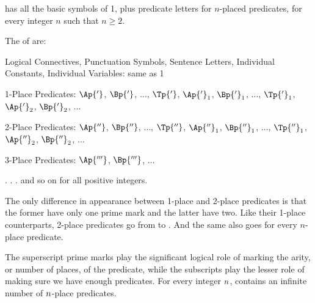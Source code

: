 \GQL{} has all the basic symbols of \GQL{}1, plus predicate letters for $n$-placed predicates, for every integer $n$ such that $n\geq2$. 
\begin{majorILnc}{}
The  of \GQL{} are:
\begin{cenumerate}
\item Logical Connectives, Punctuation Symbols, Sentence Letters, Individual Constants, Individual Variables: same as \GQL{}1
\item 1-Place Predicates: $\Ap{'}$, $\Bp{'}$, $\ldots$, $\Tp{'}$, $\Ap{'}_1$, $\Bp{'}_1$, $\ldots$, $\Tp{'}_1$, $\Ap{'}_2$, $\Bp{'}_2$, $\ldots$
\item 2-Place Predicates: $\Ap{''}$, $\Bp{''}$, $\ldots$, $\Tp{''}$, $\Ap{''}_1$, $\Bp{''}_1$, $\ldots$, $\Tp{''}_1$, $\Ap{''}_2$, $\Bp{''}_2$, $\ldots$
\item 3-Place Predicates: $\Ap{'''}$, $\Bp{'''}$, $\ldots$
\item[] \hspace{.5in} . . . and so on for all positive integers.
\end{cenumerate}
\end{majorILnc}

The only difference in appearance between 1-place and 2-place predicates is that the former have only one prime mark and the latter have two. 
Like their 1-place counterparts, 2-place predicates go from  to .  And the same also goes for every $n$-place predicate.

The superscript prime marks play the significant logical role of marking the arity, or number of places, of the predicate, while the subscripts play the lesser role of making sure we have enough predicates.  For every integer $n$, \GQL{} contains an infinite number of $n$-place predicates. 

